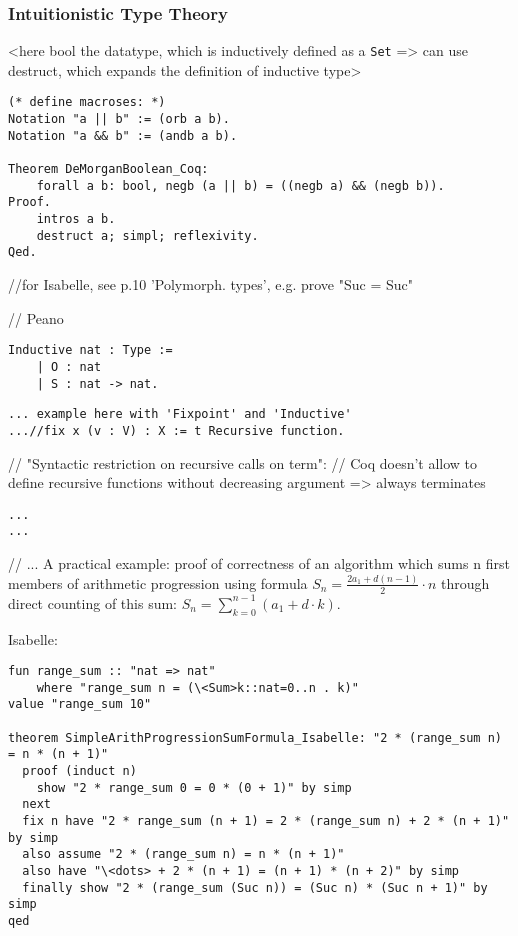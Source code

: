 \documentclass[article]{aaltoseries}
\begin{document}

\subsubsection{Intuitionistic Type Theory}

<here bool the datatype, which is inductively defined as a \texttt{Set} => can use destruct, which expands the definition of inductive type>
\begin{lstlisting}[language=coq,caption={Propositional logic proof: de Morgan's law for booleans},label={Coq:DeMorgan_bool}]
(* define macroses: *)
Notation "a || b" := (orb a b).
Notation "a && b" := (andb a b).

Theorem DeMorganBoolean_Coq:
    forall a b: bool, negb (a || b) = ((negb a) && (negb b)).
Proof.
    intros a b.
    destruct a; simpl; reflexivity.
Qed.
\end{lstlisting}
//for Isabelle, see p.10 'Polymorph. types', e.g. prove "Suc = Suc" %




// Peano
\begin{lstlisting}[language=coq]
Inductive nat : Type :=
	| O : nat
	| S : nat -> nat.
\end{lstlisting}

\begin{lstlisting}[caption={Recursive function definition: factorial}]
... example here with 'Fixpoint' and 'Inductive'
...//fix x (v : V) : X := t Recursive function.
\end{lstlisting}
// "Syntactic restriction on recursive calls on term":
// Coq doesn't allow to define recursive functions without decreasing argument => always terminates

\begin{lstlisting}[caption={Inductive data type definition: ???}]
...
...
\end{lstlisting}


// ... A practical example: proof of correctness of an algorithm which sums n first members of arithmetic progression using formula $S_{n} = { {\frac {2 a_{1} + d (n - 1)}{2} \cdot n}}$ through direct counting of this sum: $S_{n} = \sum\limits_{k=0}^{n-1} (a_{1} + d \cdot k)$.

Isabelle:


\begin{lstlisting}[language=isabelle,caption={???},label={ex_isb_arith_sum}]
fun range_sum :: "nat => nat"
	where "range_sum n = (\<Sum>k::nat=0..n . k)"
value "range_sum 10"

theorem SimpleArithProgressionSumFormula_Isabelle: "2 * (range_sum n) = n * (n + 1)"
  proof (induct n)
    show "2 * range_sum 0 = 0 * (0 + 1)" by simp
  next
  fix n have "2 * range_sum (n + 1) = 2 * (range_sum n) + 2 * (n + 1)" by simp
  also assume "2 * (range_sum n) = n * (n + 1)"
  also have "\<dots> + 2 * (n + 1) = (n + 1) * (n + 2)" by simp
  finally show "2 * (range_sum (Suc n)) = (Suc n) * (Suc n + 1)" by simp
qed
\end{lstlisting}
\end{document}
